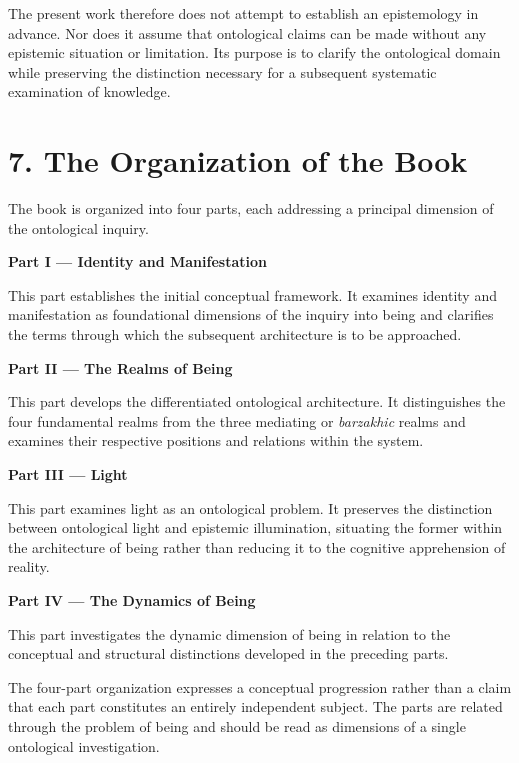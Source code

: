 The present work therefore does not attempt to establish
an epistemology in advance. Nor does it assume that
ontological claims can be made without any epistemic
situation or limitation. Its purpose is to clarify the
ontological domain while preserving the distinction
necessary for a subsequent systematic examination
of knowledge.


\section*{7. The Organization of the Book}

The book is organized into four parts, each addressing
a principal dimension of the ontological inquiry.

\noindent
\textbf{Part I --- Identity and Manifestation}

This part establishes the initial conceptual framework.
It examines identity and manifestation as foundational
dimensions of the inquiry into being and clarifies the
terms through which the subsequent architecture is
to be approached.

\medskip

\noindent
\textbf{Part II --- The Realms of Being}

This part develops the differentiated ontological
architecture. It distinguishes the four fundamental
realms from the three mediating or \textit{barzakhic}
realms and examines their respective positions and
relations within the system.

\medskip

\noindent
\textbf{Part III --- Light}

This part examines light as an ontological problem.
It preserves the distinction between ontological light
and epistemic illumination, situating the former within
the architecture of being rather than reducing it to
the cognitive apprehension of reality.

\medskip

\noindent
\textbf{Part IV --- The Dynamics of Being}

This part investigates the dynamic dimension of being
in relation to the conceptual and structural distinctions
developed in the preceding parts.

The four-part organization expresses a conceptual
progression rather than a claim that each part constitutes
an entirely independent subject. The parts are related
through the problem of being and should be read as
dimensions of a single ontological investigation.

